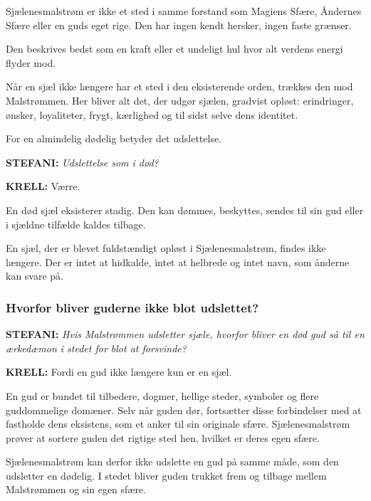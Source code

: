 \documentclass[a4paper,12pt]{memoir}
\begin{document}
Sjælenesmalstrøm er ikke et sted i samme forstand som
Magiens Sfære, Åndernes Sfære eller en guds eget rige. Den
har ingen kendt hersker, ingen faste grænser.

Den beskrives bedst som en kraft eller et undeligt hul hvor alt verdens energi flyder mod.

Når en sjæl ikke længere har et sted i den eksisterende orden,
trækkes den mod Malstrømmen. Her bliver alt det, der udgør
sjælen, gradvist opløst: erindringer, ønsker, loyaliteter,
frygt, kærlighed og til sidst selve dens identitet.

For en almindelig dødelig betyder det udslettelse.

\par\medskip

\noindent
{\sffamily\bfseries\color{Maroon!90!black} STEFANI:}
\textit{Udslettelse som i død?}

\par\smallskip

\noindent
{\sffamily\bfseries KRELL:}
Værre.

En død sjæl eksisterer stadig. Den kan dømmes, beskyttes,
sendes til sin gud eller i sjældne tilfælde kaldes tilbage.

En sjæl, der er blevet fuldstændigt opløst i Sjælenesmalstrøm,
findes ikke længere. Der er intet at hidkalde, intet at helbrede
og intet navn, som ånderne kan svare på.

\subsubsection*{Hvorfor bliver guderne ikke blot udslettet?}

\noindent
{\sffamily\bfseries\color{Maroon!90!black} STEFANI:}
\textit{Hvis Malstrømmen udsletter sjæle, hvorfor bliver en død
gud så til en ærkedæmon i stedet for blot at forsvinde?}

\par\smallskip

\noindent
{\sffamily\bfseries KRELL:}
Fordi en gud ikke længere kun er en sjæl.

En gud er bundet til tilbedere, dogmer, hellige steder,
symboler og flere guddommelige domæner. Selv når guden
dør, fortsætter disse forbindelser med at fastholde dens
eksistens, som et anker til sin originale sfære. Sjælenesmalstrøm prøver at sortere guden det rigtige sted hen, hvilket er deres egen sfære.

Sjælenesmalstrøm kan derfor ikke udslette en gud på samme
måde, som den udsletter en dødelig. I stedet bliver guden
trukket frem og tilbage mellem Malstrømmen og sin egen sfære.
\end{document}
